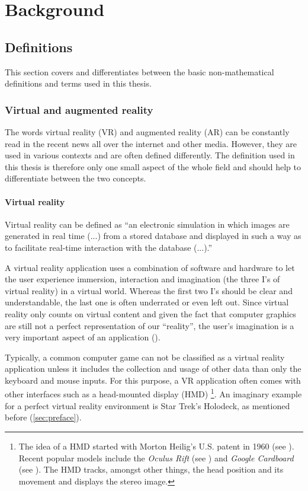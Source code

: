 \chapter{Background}

\section{Definitions}
This section covers and differentiates between the basic non-mathematical definitions and terms used in this thesis.

\subsection{Virtual and augmented reality}\label{sec:VAR}
The words virtual reality (VR) and augmented reality (AR) can be constantly read in the recent news all over the internet and other media. However, they are used in various contexts and are often defined differently. The definition used in this thesis is therefore only one small aspect of the whole field and should help to differentiate between the two concepts. 
\subsubsection{Virtual reality}
Virtual reality can be defined as \enquote{an electronic simulation in which images are generated in real time (...) from a stored database and displayed in such a way as to facilitate real-time interaction with the database (...).} \cite[p.148]{Latham.1995}

A virtual reality application uses a combination of software and hardware to let the user experience immersion, interaction and imagination (the three I's of virtual reality) in a virtual world. Whereas the first two I's should be clear and understandable, the last one is often underrated or even left out. Since virtual reality only counts on virtual content and given the fact that computer graphics are still not a perfect representation of our \enquote{reality}, the user's imagination is a very important aspect of an application (\cite[p.3 et seq.]{Burdea.2003}).

Typically, a common computer game can not be classified as a virtual reality application unless it includes the collection and usage of other data than only the keyboard and mouse inputs. For this purpose, a VR application often comes with other interfaces such as a head-mounted display (HMD) \footnote{The idea of a HMD started with Morton Heilig's   U.S. patent in 1960 (see \cite{Heilig.1957}). Recent popular models include the \textit{Oculus Rift} (see \cite{Oculus.2016}) and \textit{Google Cardboard} (see \cite{GoogleDev.2016}). The HMD tracks, amongst other things, the head position and its movement and displays the stereo image.}. An imaginary example for a perfect virtual reality environment is Star Trek's Holodeck, as mentioned before (\autoref{sec:preface}).

